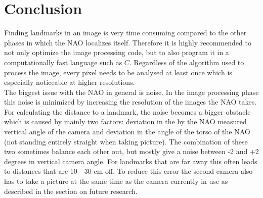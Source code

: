 \documentclass{ba-kecs}
\numberwithin{figure}{section}
\numberwithin{equation}{section}
\begin{document}

\section{Conclusion}

Finding landmarks in an image is very time consuming compared to the other phases in which the NAO localizes itself. Therefore it is highly recommended to not only optimize the image processing code, but to also program it in a computationally fast language such as $\textit{C}$. Regardless of the algorithm used to process the image, every pixel needs to be analysed at least once which is especially noticeable at higher resolutions. \\

The biggest issue with the NAO in general is noise. In the image processing phase this noise is minimized by increasing the resolution of the images the NAO takes. For calculating the distance to a landmark, the noise becomes a bigger obstacle which is caused by mainly two factors: deviation in the by the NAO measured vertical angle of the camera and deviation in the angle of the torso of the NAO (not standing entirely straight when taking picture).
The combination of these two sometimes balance each other out, but mostly give a noise between -2 and +2 degrees in vertical camera angle. For landmarks that are far away this often leads to distances that are 10 - 30 cm off. To reduce this error the second camera also has to take a picture at the same time as the camera currently in use as described in the section on future research. 



\end{document}

